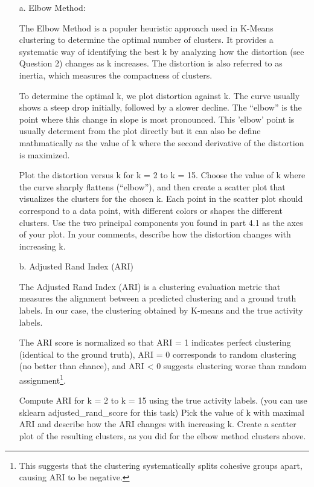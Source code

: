 \documentclass[a3paper,12pt]{extarticle} %
\begin{document}
\begin{enumerate}
\begin{itemize}
\item[a.] Elbow Method:

The Elbow Method is a populer heuristic approach used in K-Means clustering to determine the optimal number of clusters. It provides a systematic way of identifying the best k by analyzing how the distortion (see Question 2) changes as k increases. The distortion is also referred to as inertia, which measures the compactness of clusters.

To determine the optimal k, we plot distortion against k. The curve usually shows a steep drop initially, followed by a slower decline. The ``elbow'' is the point where this change in slope is most pronounced. This 'elbow' point is usually determent from the plot directly but it can also be define mathmatically as the value of k where the second derivative of the distortion is maximized.

Plot the distortion versus k for k = 2 to k = 15. Choose the value of k where the curve sharply flattens (``elbow''), and then create a scatter plot that visualizes the clusters for the chosen k. Each point in the scatter plot should correspond to a data point, with different colors or shapes the different clusters. Use the two principal components you found in part 4.1 as the axes of your plot. In your comments, describe how the distortion changes with increasing k.

\item[b.] Adjusted Rand Index (ARI)

The Adjusted Rand Index (ARI) is a clustering evaluation metric that measures the alignment between a predicted clustering and a ground truth labels. In our case, the clustering obtained by K-means and the true activity labels.

The ARI score is normalized so that ARI = 1 indicates perfect clustering (identical to the ground truth), ARI = 0 corresponds to random clustering (no better than chance), and ARI < 0 suggests clustering worse than random assignment\footnote{This suggests that the clustering systematically splits cohesive groups apart, causing ARI to be negative.}.

Compute ARI for k = 2 to k = 15 using the true activity labels. (you can use sklearn adjusted\_rand\_score for this task) Pick the value of k with maximal ARI and describe how the ARI changes with increasing k. Create a scatter plot of the resulting clusters, as you did for the elbow method clusters above.
\end{itemize}


\end{enumerate}
\end{document}
